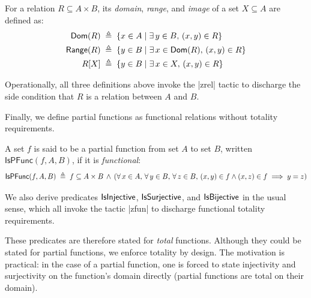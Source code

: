 \begin{definition}
  \label{def:dom-range-image}
          For a relation $R\subseteq A\times B$, its \emph{domain}, \emph{range}, and \emph{image} of a set $X\subseteq A$ are defined as:
  \begin{align*}
      \mathsf{Dom}(R)      & \;\triangleq\;  \{ x\in A \mid \exists\, y\in B,\, (x,y)\in R \}          \\
      \mathsf{Range}(R)      & \;\triangleq\;  \{ y \in B \mid \exists\, x \in \mathsf{Dom}(R),\, (x,y) \in R \} \\
      R[X] & \;\triangleq\;  \{ y \in B \mid \exists\, x \in X,\, (x, y) \in R \}
  \end{align*}

  Operationally, all three definitions above invoke the \inlinelean|zrel| tactic to discharge the side condition that $R$ is a relation between $A$ and $B$.
\end{definition}

Finally, we define partial functions as functional relations without totality requirements.
\begin{definition}
  A set $f$ is said to be a partial function from set $A$ to set $B$, written $\mathsf{IsPFunc}(f,A,B)$\footnotemark, if it is \emph{functional}:
  \begin{equation*}
    \mathsf{IsPFunc}(f, A, B) \;\triangleq\; f \subseteq A \times B \,\land\, \left(\forall\, x \in A,\, \forall\, y \in B,\, \forall\, z \in B,\, (x,y) \in f \land (x,z) \in f \implies y = z\right)
  \end{equation*}
\end{definition}

We also derive predicates $\mathsf{IsInjective}$, $\mathsf{IsSurjective}$, and $\mathsf{IsBijective}$ in the usual sense, which all invoke the tactic \inlinelean|zfun| to discharge functional totality requirements.

\begin{remark}
  These predicates are therefore stated for \emph{total} functions. Although they could be stated for partial functions, we enforce totality by design. The motivation is practical: in the case of a partial function, one is forced to state injectivity and surjectivity on the function's domain directly (partial functions are total on their domain).
\end{remark}
  
